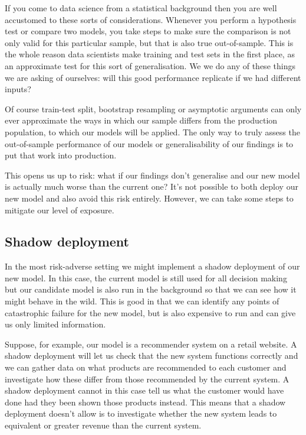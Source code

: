 \documentclass[
  letterpaper,
  DIV=11,
  numbers=noendperiod]{scrreprt}
\begin{document}
If you come to data science from a statistical background then you are
well accustomed to these sorts of considerations. Whenever you perform a
hypothesis test or compare two models, you take steps to make sure the
comparison is not only valid for this particular sample, but that is
also true out-of-sample. This is the whole reason data scientists make
training and test sets in the first place, as an approximate test for
this sort of generalisation. We we do any of these things we are asking
of ourselves: will this good performance replicate if we had different
inputs?

Of course train-test split, bootstrap resampling or asymptotic arguments
can only ever approximate the ways in which our sample differs from the
production population, to which our models will be applied. The only way
to truly assess the out-of-sample performance of our models or
generalisability of our findings is to put that work into production.

This opens us up to risk: what if our findings don't generalise and our
new model is actually much worse than the current one? It's not possible
to both deploy our new model and also avoid this risk entirely. However,
we can take some steps to mitigate our level of exposure.

\subsection{Shadow deployment}\label{shadow-deployment}

In the most risk-adverse setting we might implement a shadow deployment
of our new model. In this case, the current model is still used for all
decision making but our candidate model is also run in the background so
that we can see how it might behave in the wild. This is good in that we
can identify any points of catastrophic failure for the new model, but
is also expensive to run and can give us only limited information.

Suppose, for example, our model is a recommender system on a retail
website. A shadow deployment will let us check that the new system
functions correctly and we can gather data on what products are
recommended to each customer and investigate how these differ from those
recommended by the current system. A shadow deployment cannot in this
case tell us what the customer would have done had they been shown those
products instead. This means that a shadow deployment doesn't allow is
to investigate whether the new system leads to equivalent or greater
revenue than the current system.
\end{document}
